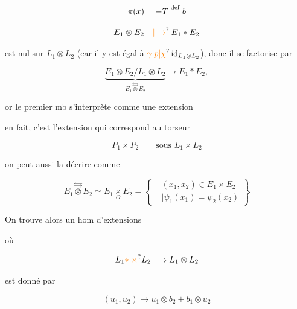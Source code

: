 \[ \pi(x)=-T\overset{\rm def}{=}b \]


\[ E_1\otimes E_2\mathbin{\unsure{-|\to}}E_1*E_2 \]


est nul sur  $L_1\otimes L_2$ (car il y est égal à $\unsure{\gamma|p|\chi}\,{\rm id}_{L_1\otimes L_2}$), donc il se factorise par

\[ \underbrace{E_1\otimes E_2/L_1\otimes L_2}_{E_1\overset{\leftrightarrows}{\otimes}E_2}\longrightarrow E_1*E_2,\tag*{$(*)$} \]

or le premier mb s'interprète comme une extension


en fait, c'est l'extension qui correspond au torseur

\[ P_1\times P_2\qquad\text{sous }L_1\times L_2 \]

on peut aussi la décrire comme

\[ E_1\overset{\leftrightarrows}{\otimes}E_2\simeq E_1\underset{\underline O}{\times}E_2=\left\{\begin{aligned}&(x_1,x_2)\in E_1\times E_2\\ &\mid\psi_1(x_1)=\psi_2(x_2)\end{aligned}\right\} \]

On trouve alors un hom d'extensions


où

\[ L_1\unsure{*|\times}L_2\longrightarrow L_1\otimes L_2 \]

est donné par

\[ (u_1,u_2)\longrightarrow u_1\otimes b_2+b_1\otimes u_2 \]


